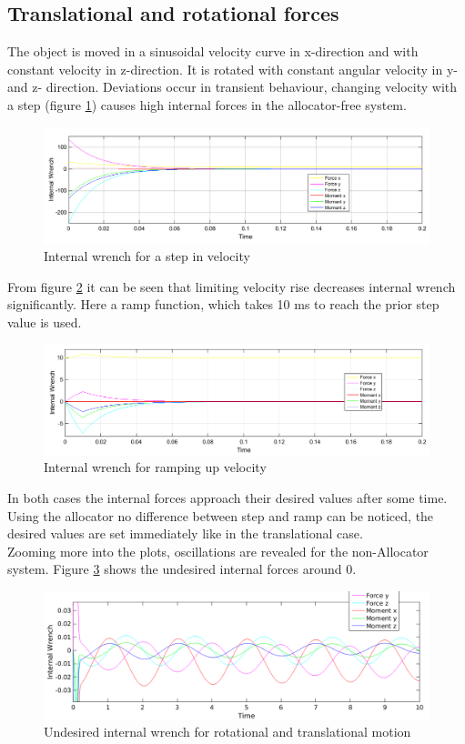 \documentclass[conference]{IEEEtran}
\begin{document}
\subsection{Translational and rotational forces}  
The object is moved in a sinusoidal velocity curve in x-direction and with constant velocity in z-direction. It is rotated with constant angular velocity in y- and z- direction. Deviations occur in transient behaviour, changing velocity with a step (figure \ref{IntForceStep}) causes high internal forces in the allocator-free system. 
\begin{figure}
\includegraphics[width=\linewidth]{IntForceStep1}
\caption{Internal wrench for a step in velocity}
\label{IntForceStep}
\end{figure}
From figure \ref{IntForceRamp} it can be seen that limiting velocity rise decreases internal wrench significantly. Here a ramp function, which takes 10 ms to reach the prior step value is used.
\begin{figure}
\includegraphics[width=\linewidth]{IntForceRamp1}
\caption{Internal wrench for ramping up velocity}
\label{IntForceRamp}
\end{figure}
In both cases the internal forces approach their desired values after some time. Using the allocator no difference between step and ramp can be noticed, the desired values are set immediately like in the translational case.\\
Zooming more into the plots, oscillations are revealed for the non-Allocator system. Figure \ref{IntForceHarmonic} shows the undesired internal forces  around 0.
\begin{figure}
\includegraphics[width=\linewidth]{IntForceHarmonic}
\caption{Undesired internal wrench for rotational and translational motion}
\label{IntForceHarmonic}
\end{figure}
\end{document}
